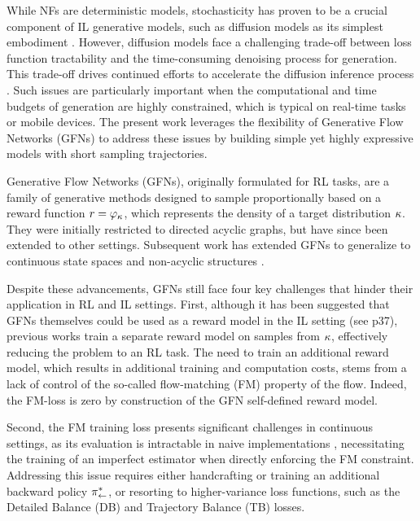 \documentclass{article}
\theoremstyle{plain}
\theoremstyle{definition}
\theoremstyle{remark}
\theoremstyle{fact}
\begin{document}
    While NFs are deterministic models, stochasticity has proven to be a crucial component of IL generative models, such as diffusion models as its simplest embodiment \cite{ho2020denoising,song2020score}. However, diffusion models face a challenging trade-off between loss function tractability and the time-consuming denoising process for generation. This trade-off drives continued efforts to accelerate the diffusion inference process \cite{lu2022dpm, tang2025adadiff, chen2024accelerating}. Such issues are particularly important when the computational and time budgets of generation are highly constrained, which is typical on real-time tasks or mobile devices. The present work leverages the flexibility of Generative Flow Networks (GFNs) \cite{bengio2021flow, bengio2023gflownet} to address these issues by building simple yet highly expressive models with short sampling trajectories. 

   Generative Flow Networks (GFNs), originally formulated for RL tasks, are a family of generative methods designed to sample proportionally based on a reward function $r = \varphi_\kappa$, which represents the density of a target distribution $\kappa$. They were initially restricted to directed acyclic graphs, but have since been extended to other settings. Subsequent work has extended GFNs to generalize to continuous state spaces \cite{li2023cflownets, lahlou2023theory} and non-acyclic structures \cite{brunswic2024theory}.
    
    Despite these advancements, GFNs still face four key challenges that hinder their application in RL and IL settings. First, although it has been suggested that GFNs themselves could be used as a reward model in the IL setting (see \citet{bengio2023gflownet} p37), previous works \cite{zhang2022generative, lahlou2023theory} train a separate reward model on samples from $\kappa$, effectively reducing the problem to an RL task. The need to train an additional reward model, which results in additional training and computation costs, stems from a lack of control of the so-called flow-matching (FM) property of the flow. Indeed, the FM-loss is zero by construction of the GFN self-defined reward model.
    
    Second, the FM training loss presents significant challenges in continuous settings, as its evaluation is intractable in naive implementations \cite{li2023cflownets}, necessitating the training of an imperfect estimator when directly enforcing the FM constraint. Addressing this issue requires either handcrafting or training an additional backward policy $\pi_{\leftarrow}^*$, or resorting to higher-variance loss functions, such as the Detailed Balance (DB) \cite{bengio2021flow} and Trajectory Balance (TB) \cite{malkin2022trajectory} losses. 
    
\end{document}
